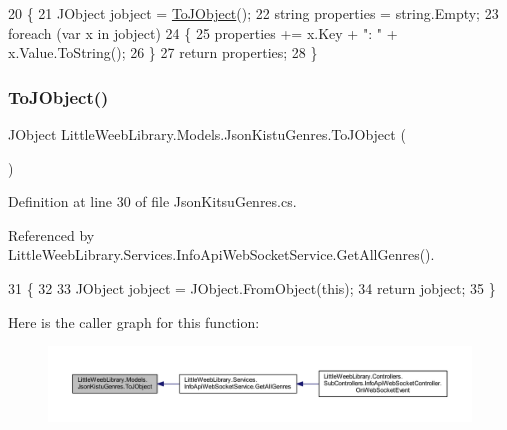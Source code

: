 \begin{DoxyCode}
20         \{
21             JObject jobject = \mbox{\hyperlink{class_little_weeb_library_1_1_models_1_1_json_kistu_genres_a0cce3f3f712276fbae17ef4d99ec6fad}{ToJObject}}();
22             \textcolor{keywordtype}{string} properties = \textcolor{keywordtype}{string}.Empty;
23             \textcolor{keywordflow}{foreach} (var x \textcolor{keywordflow}{in} jobject)
24             \{
25                 properties += x.Key + \textcolor{stringliteral}{": "} + x.Value.ToString();
26             \}
27             \textcolor{keywordflow}{return} properties;
28         \}
\end{DoxyCode}
\mbox{\label{class_little_weeb_library_1_1_models_1_1_json_kistu_genres_a0cce3f3f712276fbae17ef4d99ec6fad}} 
\subsubsection{\texorpdfstring{To\+J\+Object()}{ToJObject()}}
{\footnotesize\ttfamily J\+Object Little\+Weeb\+Library.\+Models.\+Json\+Kistu\+Genres.\+To\+J\+Object (\begin{DoxyParamCaption}{ }\end{DoxyParamCaption})}



Definition at line 30 of file Json\+Kitsu\+Genres.\+cs.



Referenced by Little\+Weeb\+Library.\+Services.\+Info\+Api\+Web\+Socket\+Service.\+Get\+All\+Genres().


\begin{DoxyCode}
31         \{
32 
33             JObject jobject = JObject.FromObject(\textcolor{keyword}{this});
34             \textcolor{keywordflow}{return} jobject;
35         \}
\end{DoxyCode}
Here is the caller graph for this function\+:\nopagebreak
\begin{figure}[H]
\begin{center}
\leavevmode
\includegraphics[width=350pt]{class_little_weeb_library_1_1_models_1_1_json_kistu_genres_a0cce3f3f712276fbae17ef4d99ec6fad_icgraph}
\end{center}
\end{figure}


